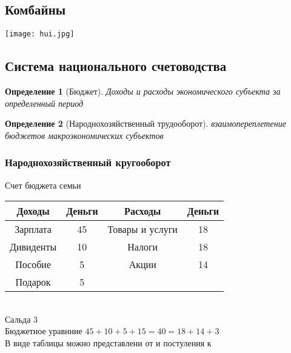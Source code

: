 \documentclass[14pt]{extarticle}
\newtheorem{definition}{Определение}
\begin{document}
\subsection{Комбайны}
\texttt{[image: hui.jpg]}
\subsection{Система национального счетоводства}
\begin{definition}[Бюджет]
    Доходы и расходы экономического субъекта за определенный период
\end{definition}
\begin{definition}[Народнохозяйственный трудооборот]
    взаимопереплетение бюджетов макроэкономических субъектов
\end{definition}
\subsubsection{Народнохозяйственный кругооборот}
Счет бюджета семьи\\
\begin{tabular}{|c|c|c|c|}
    Доходы & Деньги & Расходы& Деньги\\
    \hline
    Зарплата & 45 & Товары и услуги & 18\\
    \hline
    Дивиденты & 10 & Налоги & 18\\
    \hline
    Пособие & 5 & Акции & 14\\
    \hline 
    Подарок & 5 & & \\
    \hline
\end{tabular}\\
Сальда $3$\\
Бюджетное уравнние $45 + 10 + 5 + 15 = 40 = 18 + 14 + 3$\\
В виде таблицы можно представлени от и постуления к
\end{document}
